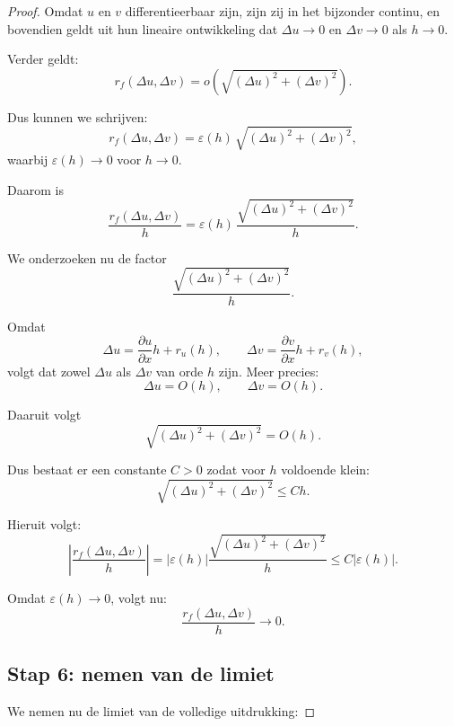\documentclass[11pt,a4paper]{article}
\begin{document}
\begin{proof}
        Omdat $u$ en $v$ differentieerbaar zijn, zijn zij in het bijzonder continu,
        en bovendien geldt uit hun lineaire ontwikkeling dat $\Delta u \to 0$ en
        $\Delta v \to 0$ als $h\to 0$.

        Verder geldt:
        \[
            r_f(\Delta u,\Delta v)
            =
            o\!\left(\sqrt{(\Delta u)^2+(\Delta v)^2}\right).
        \]

        Dus kunnen we schrijven:
        \[
            r_f(\Delta u,\Delta v)
            =
            \varepsilon(h)\,\sqrt{(\Delta u)^2+(\Delta v)^2},
        \]
        waarbij $\varepsilon(h)\to0$ voor $h\to0$.

        Daarom is
        \[
            \frac{r_f(\Delta u,\Delta v)}{h}
            =
            \varepsilon(h)\,
            \frac{\sqrt{(\Delta u)^2+(\Delta v)^2}}{h}.
        \]

        We onderzoeken nu de factor
        \[
            \frac{\sqrt{(\Delta u)^2+(\Delta v)^2}}{h}.
        \]

        Omdat
        \[
            \Delta u = \frac{\partial u}{\partial x}h + r_u(h),
            \qquad
            \Delta v = \frac{\partial v}{\partial x}h + r_v(h),
        \]
        volgt dat zowel $\Delta u$ als $\Delta v$ van orde $h$ zijn. Meer precies:
        \[
            \Delta u = O(h),
            \qquad
            \Delta v = O(h).
        \]

        Daaruit volgt
        \[
            \sqrt{(\Delta u)^2+(\Delta v)^2}=O(h).
        \]

        Dus bestaat er een constante $C>0$ zodat voor $h$ voldoende klein:
        \[
            \sqrt{(\Delta u)^2+(\Delta v)^2} \leq Ch.
        \]

        Hieruit volgt:
        \[
            \left|
                \frac{r_f(\Delta u,\Delta v)}{h}
            \right|
            =
            |\varepsilon(h)|
            \frac{\sqrt{(\Delta u)^2+(\Delta v)^2}}{h}
            \leq
            C|\varepsilon(h)|.
        \]

        Omdat $\varepsilon(h)\to0$, volgt nu:
        \[
            \frac{r_f(\Delta u,\Delta v)}{h}\to0.
        \]

        \subsection*{Stap 6: nemen van de limiet}

        We nemen nu de limiet van de volledige uitdrukking:


\end{proof}
\end{document}
